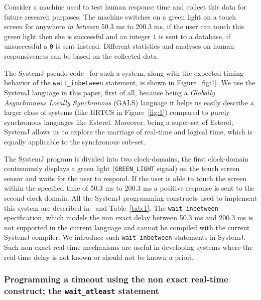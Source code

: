 Consider a machine used to test human response time and collect this
data for future research purposes. The machine switches on a green light
on a touch screen for anywhere \textit{in between} 50.3 ms to 200.3 ms,
if the user can touch this green light then she is successful and an
integer \texttt{1} is sent to a database, if unsuccessful a \texttt{0}
is sent instead. Different statistics and analyses on human
responsiveness can be based on the collected data.

The SystemJ pseudo-code~\cite{amal10} for such a system, along with the
expected timing behavior of the \texttt{wait\_inbetween} statement, is
shown in Figure~\ref{fig:1}. We use the SystemJ language in this paper,
first of all, because being a \textit{Globally Asynchronous Locally
  Synchronous} (GALS) language it helps us easily describe a larger
class of systems (like HRTCS in Figure~\ref{fig:1}) compared to purely
synchronous languages like Esterel. Moreover, being a super-set of
Esterel, SystemJ allows us to explore the marriage of real-time and
logical time, which is equally applicable to the synchronous sub-set.

The SystemJ program is divided into two clock-domains, the first
clock-domain continuously displays a green light (\texttt{GREEN\_LIGHT}
signal) on the touch screen sensor and waits for the user to respond. If
the user is able to touch the screen within the specified time of 50.3
ms to 200.3 ms a positive response is sent to the second
clock-domain. All the SystemJ programming constructs used to implement
this system are described in~\cite{amal10} and Table~\ref{tab:1}. The
\texttt{wait\_inbetween} specification, which models the non exact delay
between 50.3 ms and 200.3 ms is not supported in the current language
and cannot be compiled with the current SystemJ compiler. We introduce
such \texttt{wait\_inbetween} statements in SystemJ. Such non exact
real-time mechanisms are useful in developing systems where the
real-time delay is not known or should not be known a priori.

\subsubsection{Programming a timeout using the non exact real-time
  construct; the \texttt{wait\_atleast} statement}
\label{sec:progr-time-using}

